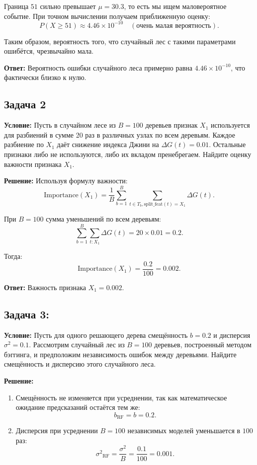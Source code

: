 Граница \(51\) сильно превышает \(\mu=30.3\), то есть мы ищем маловероятное событие. При точном вычислении получаем приближенную оценку:
\[
    P(X \geq 51) \approx 4.46 \times 10^{-10} \quad (\text{очень малая вероятность}).
\]

Таким образом, вероятность того, что случайный лес с такими параметрами ошибётся, чрезвычайно мала.

\textbf{Ответ:} Вероятность ошибки случайного леса примерно равна \(4.46 \times 10^{-10}\), что фактически близко к нулю.


\subsection*{Задача 2}

\textbf{Условие:} Пусть в случайном лесе из \(B = 100\) деревьев признак \(X_1\) используется для разбиений в сумме 20 раз в различных узлах по всем деревьям. Каждое разбиение по \(X_1\) даёт снижение индекса Джини на \(\Delta G(t) = 0.01\). Остальные признаки либо не используются, либо их вкладом пренебрегаем. Найдите оценку важности признака \(X_1\).

\textbf{Решение:} Используя формулу важности:
\[
    \text{Importance}(X_1) = \frac{1}{B} \sum_{b=1}^B \sum_{t \in T_b, \text{split\_feat}(t)=X_1} \Delta G(t).
\]

При \(B = 100\) сумма уменьшений по всем деревьям:
\[
    \sum_{b=1}^B \sum_{t: X_1} \Delta G(t) = 20 \times 0.01 = 0.2.
\]

Тогда:
\[
    \text{Importance}(X_1) = \frac{0.2}{100} = 0.002.
\]

\textbf{Ответ:} Важность признака \(X_1 = 0.002.\)


\subsection*{Задача 3:}

\textbf{Условие:} Пусть для одного решающего дерева смещённость \(b = 0.2\) и дисперсия \(\sigma^2 = 0.1\). Рассмотрим случайный лес из \(B = 100\) деревьев, построенный методом бэггинга, и предположим независимость ошибок между деревьями. Найдите смещённость и дисперсию этого случайного леса.

\textbf{Решение:}
\begin{enumerate}
    \item Смещённость не изменяется при усреднении, так как математическое ожидание предсказаний остаётся тем же:
          \[
              b_{\text{RF}} = b = 0.2.
          \]
    \item Дисперсия при усреднении \(B = 100\) независимых моделей уменьшается в \(100\) раз:
          \[
              {\sigma^2}_{\text{RF}} = \frac{\sigma^2}{B} = \frac{0.1}{100} = 0.001.
          \]
\end{enumerate}


